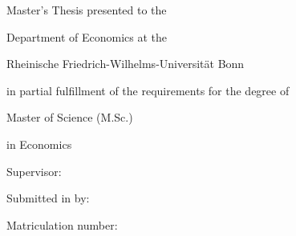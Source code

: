 \begin{titlepage}
\centering
\vspace*{2cm}

{\fontsize{14bp}{19.5bp}\selectfont\bfseries\ThesisTitle\par}

\vspace{2cm}
Master's Thesis presented to the\par
\vspace{0.3cm}
Department of Economics at the\par
\vspace{0.3cm}
Rheinische Friedrich-Wilhelms-Universit\"at Bonn\par
\vspace{0.3cm}
in partial fulfillment of the requirements for the degree of\par
\vspace{0.3cm}
Master of Science (M.Sc.)\par
in Economics\par

\vspace{2cm}
Supervisor: \ThesisSupervisor\par

\vspace{2cm}
Submitted in \ThesisSubmissionMonthYear{} by:\par
\vspace{0.2cm}
\ThesisAuthor\par
Matriculation number: \ThesisMatriculation\par

\vfill
\end{titlepage}
